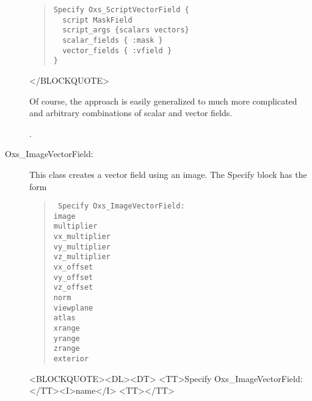 \begin{description}
\begin{quote}
\begin{verbatim}
Specify Oxs_ScriptVectorField {
  script MaskField
  script_args {scalars vectors}
  scalar_fields { :mask }
  vector_fields { :vfield }
}
\end{verbatim}
\end{quote}
\begin{rawhtml}
</BLOCKQUOTE>
\end{rawhtml}
Of course, the  approach is easily
generalized to much more complicated and arbitrary combinations of
scalar and vector fields.

\begin{ExampleMifs}[Example]
  .
\end{ExampleMifs}

%
\item[Oxs\_ImageVectorField:\label{item:ImageVectorField}]
This class creates a vector field using an image.  The Specify block has
the form
\begin{latexonly}
\begin{quote}\tt
Specify Oxs\_ImageVectorField: \ocb\\
 \bi image \\
 \bi multiplier \\
 \bi vx\_multiplier \\
 \bi vy\_multiplier \\
 \bi vz\_multiplier \\
 \bi vx\_offset \\
 \bi vy\_offset \\
 \bi vz\_offset \\
 \bi norm \\
 \bi viewplane \\
 \bi atlas \\
 \bi xrange \ocb{}\ccb\\
 \bi yrange \ocb{}\ccb\\
 \bi zrange \ocb{}\ccb\\
 \bi exterior \\
\ccb
\end{quote}
\end{latexonly}
\begin{rawhtml}
<BLOCKQUOTE><DL><DT>
<TT>Specify Oxs_ImageVectorField:</TT><I>name</I> <TT>{</TT>
}
\end{rawhtml}
\end{description}
